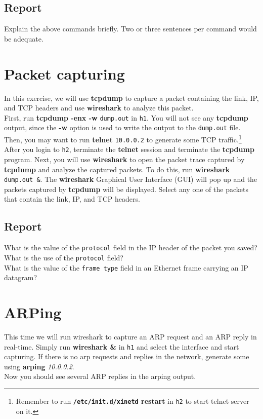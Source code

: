\documentclass{../UTNetLab}
\begin{document}
    \subsection*{Report}
    Explain the above commands briefly.
    Two or three sentences per command would be adequate.

\section{Packet capturing}
    In this exercise, we will use \textbf{tcpdump} to capture a packet containing the link, IP, and TCP headers and use \textbf{wireshark} to analyze this packet. \\
    First, run \textbf{tcpdump -enx -w} \texttt{dump.out} in \texttt{h1}.
    You will not see any \textbf{tcpdump} output, since the \textbf{-w} option is used to write the output to the \texttt{dump.out} file. \\
    Then, you may want to run \textbf{telnet} \texttt{10.0.0.2} to generate some TCP traffic.\footnote{Remember to run \textbf{\texttt{/etc/init.d/xinetd} restart} in \texttt{h2} to start telnet server on it.}
    After you login to \texttt{h2}, terminate the \textbf{telnet} session and terminate the \textbf{tcpdump} program.
    Next, you will use \textbf{wireshark} to open the packet trace captured by \textbf{tcpdump} and analyze the captured packets.
    To do this, run \textbf{wireshark} \texttt{dump.out \&}.
    The \textbf{wireshark} Graphical User Interface (GUI) will pop up and the packets captured by \textbf{tcpdump} will be displayed.
    Select any one of the packets that contain the link, IP, and TCP headers.
    \subsection*{Report}
    What is the value of the \texttt{protocol} field in the IP header of the packet you saved?
    What is the use of the \texttt{protocol} field? \\
    What is the value of the \texttt{frame type} field in an Ethernet frame carrying an IP datagram?

\section{ARPing}
    This time we will run wireshark to capture an ARP request and an ARP reply in real-time. Simply run \textbf{wireshark \&} in \texttt{h1} and select the interface and start capturing.
    If there is no arp requests and replies in the network, generate some using \textbf{arping} \textit{10.0.0.2}. \\
    Now you should see several ARP replies in the arping output.
\end{document}
